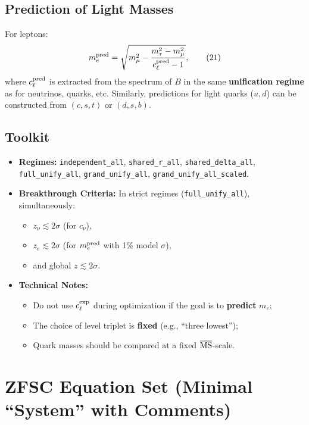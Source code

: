 \documentclass[12pt,a4paper]{article}
\begin{document}
\subsection{Prediction of Light Masses}
For leptons:
\[
m_e^{\rm pred} = \sqrt{m_\mu^2 - \frac{m_\tau^2 - m_\mu^2}{c_\ell^{\rm pred} - 1}}, \tag{21}
\]
where \(c_\ell^{\rm pred}\) is extracted from the spectrum of \(B\) in the same \textbf{unification regime} as for neutrinos, quarks, etc. Similarly, predictions for light quarks (\(u,d\)) can be constructed from \((c,s,t)\) or \((d,s,b)\).

\subsection{Toolkit}
\begin{itemize}
    \item \textbf{Regimes:} \texttt{independent\_all}, \texttt{shared\_r\_all}, \texttt{shared\_delta\_all}, \texttt{full\_unify\_all}, \texttt{grand\_unify\_all}, \texttt{grand\_unify\_all\_scaled}.
    \item \textbf{Breakthrough Criteria:} In strict regimes (\texttt{full\_unify\_all}), simultaneously:
    \begin{itemize}
        \item \(z_\nu \lesssim 2\sigma\) (for \(c_\nu\)),
        \item \(z_e \lesssim 2\sigma\) (for \(m_e^{\rm pred}\) with 1\% model \(\sigma\)),
        \item and global \(z \lesssim 2\sigma\).
    \end{itemize}
    \item \textbf{Technical Notes:}
    \begin{itemize}
        \item Do not use \(c_\ell^{\rm exp}\) during optimization if the goal is to \textbf{predict} \(m_e\);
        \item The choice of level triplet is \textbf{fixed} (e.g., ``three lowest'');
        \item Quark masses should be compared at a fixed \(\overline{\rm MS}\)-scale.
    \end{itemize}
\end{itemize}

\section{ZFSC Equation Set (Minimal ``System'' with Comments)}
\end{document}
